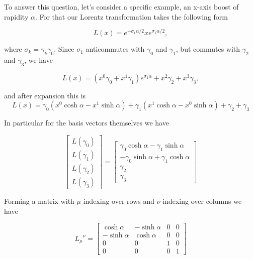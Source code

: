 To answer this question, let's consider a specific example, an x-axis boost of rapidity $\alpha$.  For that our Lorentz transformation takes the following form

\begin{equation}\label{eqn:antisymmetricTensorTx:430}
L(x) = e^{-\sigma_1 \alpha/2} x e^{\sigma_1 \alpha/2},
\end{equation}

where $\sigma_k = \gamma_k \gamma_0$.  Since $\sigma_1$ anticommutes with $\gamma_0$ and $\gamma_1$, but commutes with $\gamma_2$ and $\gamma_3$, we have

\begin{equation}\label{eqn:antisymmetricTensorTx:440}
L(x) = (x^0 \gamma_0 + x^1 \gamma_1) e^{\sigma_1 \alpha} + x^2 \gamma_2 + x^3 \gamma_3,
\end{equation}

and after expansion this is
\begin{equation}\label{eqn:antisymmetricTensorTx:441}
L(x) = 
\gamma_0 ( x^0 \cosh \alpha - x^1 \sinh \alpha ) 
+\gamma_1 ( x^1 \cosh \alpha - x^0 \sinh \alpha )
+\gamma_2
+\gamma_3
\end{equation}

In particular for the basis vectors themselves we have

\begin{equation}\label{eqn:antisymmetricTensorTx:450}
\begin{bmatrix}
L(\gamma_0) \\
L(\gamma_1) \\
L(\gamma_2) \\
L(\gamma_3)
\end{bmatrix}
=
\begin{bmatrix}
\gamma_0 \cosh \alpha - \gamma_1 \sinh \alpha \\
-\gamma_0 \sinh \alpha + \gamma_1 \cosh \alpha \\
\gamma_2 \\
\gamma_3
\end{bmatrix}
\end{equation}

Forming a matrix with $\mu$ indexing over rows and $\nu$ indexing over columns we have

\begin{equation}\label{eqn:antisymmetricTensorTx:460}
{L_\mu}^\nu =
\begin{bmatrix}
\cosh \alpha &- \sinh \alpha & 0 & 0 \\
-\sinh \alpha & \cosh \alpha & 0 & 0 \\
0 & 0 & 1 & 0 \\
0 & 0 & 0 & 1
\end{bmatrix}
\end{equation}

